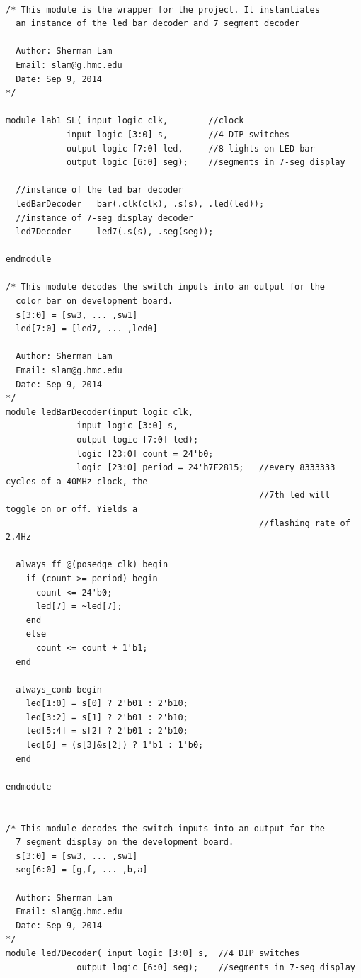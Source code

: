 \documentclass[11pt]{article}
\begin{document}
\small\begin{verbatim}

/* This module is the wrapper for the project. It instantiates
  an instance of the led bar decoder and 7 segment decoder
  
  Author: Sherman Lam
  Email: slam@g.hmc.edu
  Date: Sep 9, 2014
*/

module lab1_SL( input logic clk,        //clock
            input logic [3:0] s,        //4 DIP switches
            output logic [7:0] led,     //8 lights on LED bar
            output logic [6:0] seg);    //segments in 7-seg display
  
  //instance of the led bar decoder
  ledBarDecoder   bar(.clk(clk), .s(s), .led(led));   
  //instance of 7-seg display decoder
  led7Decoder     led7(.s(s), .seg(seg)); 

endmodule

/* This module decodes the switch inputs into an output for the 
  color bar on development board.
  s[3:0] = [sw3, ... ,sw1]
  led[7:0] = [led7, ... ,led0]
  
  Author: Sherman Lam
  Email: slam@g.hmc.edu
  Date: Sep 9, 2014
*/
module ledBarDecoder(input logic clk,
              input logic [3:0] s,
              output logic [7:0] led);
              logic [23:0] count = 24'b0;
              logic [23:0] period = 24'h7F2815;   //every 8333333 cycles of a 40MHz clock, the
                          	                      //7th led will toggle on or off. Yields a 
                          	                      //flashing rate of 2.4Hz
  
  always_ff @(posedge clk) begin
    if (count >= period) begin
      count <= 24'b0;
      led[7] = ~led[7];
    end
    else            
      count <= count + 1'b1;
  end
  
  always_comb begin
    led[1:0] = s[0] ? 2'b01 : 2'b10;
    led[3:2] = s[1] ? 2'b01 : 2'b10;
    led[5:4] = s[2] ? 2'b01 : 2'b10;
    led[6] = (s[3]&s[2]) ? 1'b1 : 1'b0;
  end

endmodule


/* This module decodes the switch inputs into an output for the 
  7 segment display on the development board.
  s[3:0] = [sw3, ... ,sw1]
  seg[6:0] = [g,f, ... ,b,a]
  
  Author: Sherman Lam
  Email: slam@g.hmc.edu
  Date: Sep 9, 2014
*/
module led7Decoder( input logic [3:0] s,  //4 DIP switches
              output logic [6:0] seg);    //segments in 7-seg display
              

\end{verbatim}
\end{document}
